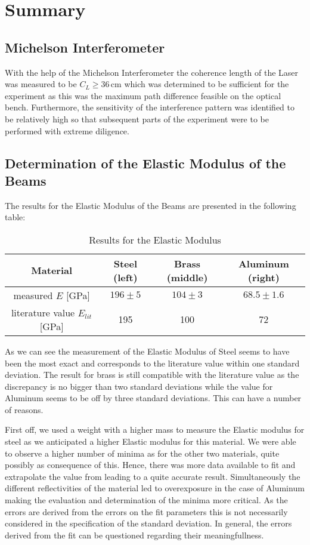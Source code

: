 \section{Summary}

\subsection{Michelson Interferometer}

With the help of the Michelson Interferometer the coherence length of the Laser was measured to be $C_L \geq 36\,\mathrm{cm}$ which was determined to be sufficient for the experiment as this was the maximum path difference feasible on the optical bench. Furthermore, the sensitivity of the interference pattern was identified to be relatively high so that subsequent parts of the experiment were to be performed with extreme diligence.

\subsection{Determination of the Elastic Modulus of the Beams}

The results for the Elastic Modulus of the Beams are presented in the following table:

\begin{table}[h!]
	\centering
	\begin{tabular}{c|c|c|c}
		Material							& Steel (left)	& Brass (middle)	& Aluminum (right)\\ \hline\hline
		measured $E$ [GPa]			& $196\pm5$	& 	$104\pm3$		& $68.5\pm1.6$			\\ \hline
	literature value \cite{staats} $E_{lit}$ [GPa]	& 195			& 100				& 72
	\end{tabular}
	\caption{Results for the Elastic Modulus}
\end{table}

As we can see the measurement of the Elastic Modulus of Steel seems to have been the most exact and corresponds to the literature value within one standard deviation.  The result for brass is still compatible with the literature value as the discrepancy is no bigger than two standard deviations while the value for Aluminum seems to be off by three standard deviations. This can have a number of reasons.

First off, we used a weight with a higher mass to measure the Elastic modulus for steel as we anticipated a higher Elastic modulus for this material. We were able to observe a higher number of minima as for the other two materials, quite possibly as consequence of this. Hence, there was more data available to fit and extrapolate the value from leading to a quite accurate result.
Simultaneously the different reflectivities of the material led to overexposure in the case of Aluminum making the evaluation and determination of the minima more critical. As the errors are derived from the errors on the fit parameters this is not necessarily considered in the specification of the standard deviation. In general, the errors derived from the fit can be questioned regarding their meaningfullness.

